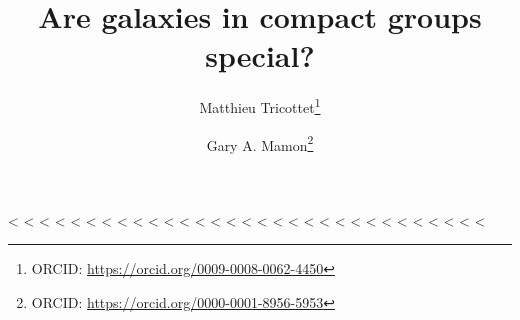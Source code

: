 \documentclass{aa}
\begin{document}
<%
<%
<%
<%
<%
<%
<%
<%
<%
<%
<%
<%
<%
<%
<%
<%
<%
<%
<%
<%
<%
<%
<%
<%
<%
<%
<%
<%
<%
<%
<%
\nolinenumbers
\title{Are galaxies in compact groups special?}

   \author{Matthieu Tricottet\thanks{ORCID: \url{https://orcid.org/0009-0008-0062-4450}}
           \and Gary A. Mamon\thanks{ORCID: \url{https://orcid.org/0000-0001-8956-5953}}
           }

\end{document}
